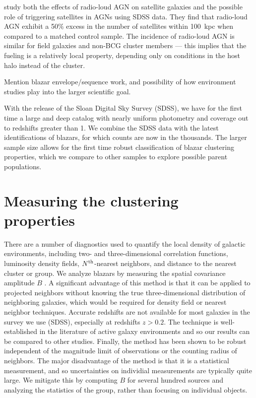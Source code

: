 \documentclass{emulateapj}
\begin{document}
\citet{pac14} study both the effects of radio-loud AGN on satellite galaxies and the possible role of triggering satellites in AGNs using SDSS data. They find that radio-loud AGN exhibit a 50\% excess in the number of satellites within 100~kpc when compared to a matched control sample. The incidence of radio-loud AGN is similar for field galaxies and non-BCG cluster members --- this implies that the fueling is a relatively local property, depending only on conditions in the host halo instead of the cluster. 

Mention blazar envelope/sequence work, and possibility of how environment studies play into the larger scientific goal. 

With the release of the Sloan Digital Sky Survey (SDSS), we have for the first time a large and deep catalog with nearly uniform photometry and coverage out to redshifts greater than 1. We combine the SDSS data with the latest identifications of blazars, for which counts are now in the thousands. The larger sample size allows for the first time robust classification of blazar clustering properties, which we compare to other samples to explore possible parent populations.


\section{Measuring the clustering properties}\label{sec-data}

There are a number of diagnostics used to quantify the local density of galactic environments, including two- and three-dimensional correlation functions, luminosity density fields, $N^{{\rm th}}$-nearest neighbors, and distance to the nearest cluster or group. We analyze blazars by measuring the spatial covariance amplitude $B$ \citep{lon79}. A significant advantage of this method is that it can be applied to projected neighbors without knowing the true three-dimensional distribution of neighboring galaxies, which would be required for density field or nearest neighbor techniques. Accurate redshifts are not available for most galaxies in the survey we use (SDSS), especially at redshifts $z>0.2$. The technique is well-established in the literature of active galaxy environments \citep[e.g.,][]{pre88,yee87,ell89,wur97} and so our results can be compared to other studies. Finally, the method has been shown to be robust independent of the magnitude limit of observations or the counting radius of neighbors. The major disadvantage of the method is that it is a statistical measurement, and so uncertainties on individial measurements are typically quite large. We mitigate this by computing $B$ for several hundred sources and analyzing the statistics of the group, rather than focusing on individual objects. 
\end{document}
